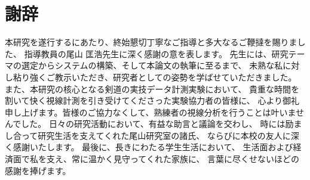 \documentclass[dvipdfmx]{ujreport}
\begin{document}
\chapter*{謝辞}
本研究を遂行するにあたり、終始懇切丁寧なご指導と多大なるご鞭撻を賜りました、
指導教員の尾山 匡浩先生に深く感謝の意を表します。
先生には、研究テーマの選定からシステムの構築、そして本論文の執筆に至るまで、
未熟な私に対し粘り強くご教示いただき、研究者としての姿勢を学ばせていただきました。
また、本研究の核心となる剣道の実技データ計測実験において、
貴重な時間を割いて快く視線計測を引き受けてくださった実験協力者の皆様に、
心より御礼申し上げます。皆様のご協力なくして、熟練者の視線分析を行うことは叶いませんでした。
日々の研究活動において、有益な助言と議論を交わし、
時には励まし合って研究生活を支えてくれた尾山研究室の諸氏、
ならびに本校の友人に深く感謝いたします。
最後に、長きにわたる学生生活において、
生活面および経済面で私を支え、常に温かく見守ってくれた家族に、
言葉に尽くせないほどの感謝を捧げます。
\end{document}
